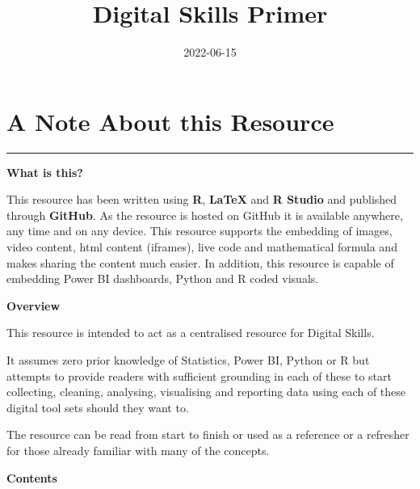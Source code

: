 \documentclass[
]{book}
\title{Digital Skills Primer}
\author{}
\date{\vspace{-2.5em}2022-06-15}
\begin{document}
\maketitle

{
\setcounter{tocdepth}{1}
\tableofcontents
}
\hypertarget{A-Note-About-this-Resource}{%
\chapter*{A Note About this Resource}\label{A-Note-About-this-Resource}}

\begin{center}\rule{0.5\linewidth}{0.5pt}\end{center}

\textbf{What is this?}

This resource has been written using \textbf{R}, \textbf{LaTeX} and \textbf{R Studio} and published through \textbf{GitHub}. As the resource is hosted on GitHub it is available anywhere, any time and on any device. This resource supports the embedding of images, video content, html content (iframes), live code and mathematical formula and makes sharing the content much easier. In addition, this resource is capable of embedding Power BI dashboards, Python and R coded visuals.

\textbf{Overview}

This resource is intended to act as a centralised resource for Digital Skills.

It assumes zero prior knowledge of Statistics, Power BI, Python or R but attempts to provide readers with sufficient grounding in each of these to start collecting, cleaning, analysing, visualising and reporting data using each of these digital tool sets should they want to.

The resource can be read from start to finish or used as a reference or a refresher for those already familiar with many of the concepts.

\textbf{Contents}
\end{document}
